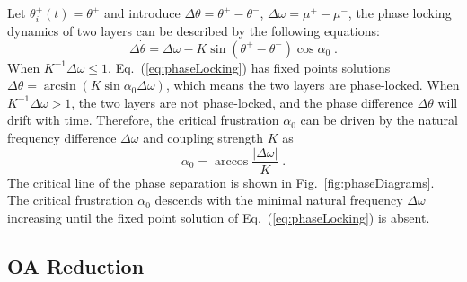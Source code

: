 \documentclass{article}
\begin{document}
Let $\theta _{i}^{\pm}\left( t \right) =\theta ^{\pm}$ and introduce $\Delta \theta=\theta^{+}-\theta^{-}$, $\Delta \omega=\mu^{+}-\mu^{-}$, the phase locking dynamics of two layers can be described by the following equations:
\begin{equation}
    \label{eq:phaseLocking}
    \Delta \dot{\theta}=\Delta \omega -K\sin \left( \theta ^+-\theta ^- \right) \cos \alpha _0\;.
\end{equation}
When $K^{-1}\Delta \omega \leqslant 1$, Eq.~(\ref{eq:phaseLocking}) has fixed points solutions $\Delta \theta =\arcsin \left( K\sin \alpha _0\Delta \omega \right)$, which means the two layers are phase-locked. 
When $K^{-1}\Delta \omega > 1$, the two layers are not phase-locked, and the phase difference $\Delta \theta$ will drift with time. Therefore, the critical frustration $\alpha _0$ can be driven by the natural frequency difference $\Delta \omega$ and coupling strength $K$ as
\begin{equation}
    \label{eq:criticalFrustration}
    \alpha _0=\arccos \frac{\left| \Delta \omega \right|}{K}\;.
\end{equation}
The critical line of the phase separation is shown in Fig.~\ref{fig:phaseDiagrams}. The critical frustration $\alpha _0$ descends with the minimal natural frequency $\Delta \omega$ increasing until the fixed point solution of Eq.~(\ref{eq:phaseLocking}) is absent.



\color{darkGreen}
\subsection{OA Reduction}
\end{document}
